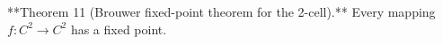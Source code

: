 **Theorem 11 (Brouwer fixed-point theorem for the 2-cell).** Every mapping $f: C^2 \rightarrow C^2$ has a fixed point.
